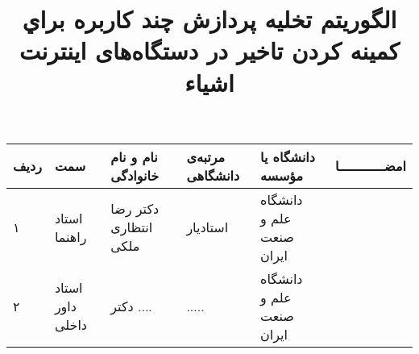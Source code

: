 \subject{مهندسی کامپیوتر}
\title{الگوريتم تخليه پردازش چند كاربره براي كمينه كردن تاخير در دستگاه‌های اينترنت اشياء}

\def \CurrentProject {پروژه‌ی فعلی }
\firstPage
\besmPage
\davaranPage

\begin{center}
\begin{tabular}{| p{8mm} | p{18mm} | p{} |p{14mm}|p{}|c|}
\hline
ردیف	& سمت & نام و نام خانوادگی & مرتبه‌ی \newline دانشگاهی &	دانشگاه یا مؤسسه & امضــــــــــــا\\
\hline
۱  & استاد راهنما & دکتر \newline رضا انتظاری ملکی 
& استادیار & دانشگاه \newline علم و صنعت ایران &  \\
\hline
۲ & استاد داور \newline داخلی	 & دکتر \newline ....  & ..... & 
دانشگاه  \newline علم ‌و صنعت ایران & \\
\hline

\end{tabular}
\end{center}

